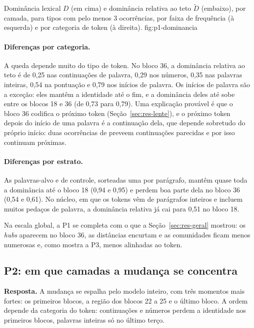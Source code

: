     {Dominância lexical $D$ (em cima) e dominância relativa ao teto $\tilde D$ (embaixo), por
    camada, para tipos com pelo menos 3 ocorrências, por faixa de frequência (à esquerda) e por
    categoria de token (à direita).}
    {fig:p1-dominancia}

\paragraph{Diferenças por categoria.} A queda depende muito do tipo de token. No bloco 36, a
dominância relativa ao teto é de 0,25 nas continuações de palavra, 0,29 nos números, 0,35 nas
palavras inteiras, 0,54 na pontuação e 0,79 nos inícios de palavra. Os inícios de palavra são a
exceção: eles mantêm a identidade até o fim, e a dominância deles até sobe entre os blocos 18 e
36 (de 0,73 para 0,79). Uma explicação provável é que o bloco 36 codifica o próximo token
(Seção~\ref{sec:res-lente}), e o próximo token depois do início de uma palavra é a continuação
dela, que depende sobretudo do próprio início: duas ocorrências de  preveem
continuações parecidas e por isso continuam próximas.

\paragraph{Diferenças por estrato.} As palavras-alvo e de controle, sorteadas uma por parágrafo,
mantêm quase toda a dominância até o bloco 18 (0,94 e 0,95) e perdem boa parte dela no bloco
36 (0,54 e 0,61). No núcleo, em que os tokens vêm de parágrafos inteiros e incluem muitos pedaços de
palavra, a dominância relativa já cai para 0,51 no bloco 18.

Na escala global, a P1 se completa com o que a Seção~\ref{sec:res-geral} mostrou: os
\emph{hubs} aparecem no bloco 36, as distâncias encurtam e as comunidades ficam menos numerosas
e, como mostra a P3, menos alinhadas ao token.

\subsection{P2: em que camadas a mudança se concentra}\label{sec:res-p2}

\textbf{Resposta.} A mudança se espalha pelo modelo inteiro, com três momentos mais fortes: os
primeiros blocos, a região dos blocos 22 a 25 e o último bloco. A ordem depende da categoria do
token: continuações e números perdem a identidade nos primeiros blocos, palavras inteiras só no
último terço.

